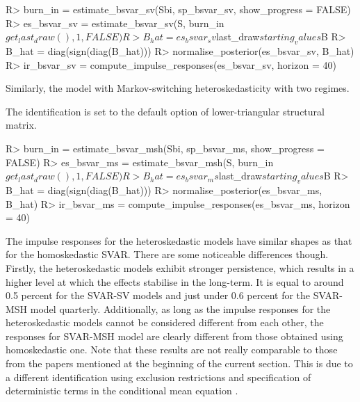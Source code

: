 \documentclass[
  nojss]{jss}
\begin{document}
\begin{CodeChunk}
\begin{CodeInput}
R> burn_in       = estimate_bsvar_sv(Sbi, sp_bsvar_sv, show_progress = FALSE)
R> es_bsvar_sv   = estimate_bsvar_sv(S, burn_in$get_last_draw(), 1, FALSE)
R> B_hat         = es_bsvar_sv$last_draw$starting_values$B
R> B_hat         = diag(sign(diag(B_hat))) %
R> normalise_posterior(es_bsvar_sv, B_hat)
R> ir_bsvar_sv   = compute_impulse_responses(es_bsvar_sv, horizon = 40)
\end{CodeInput}
\end{CodeChunk}

Similarly, the model with Markov-switching heteroskedasticity with two
regimes.

\begin{CodeChunk}
\begin{CodeOutput}
The identification is set to the default option of lower-triangular structural matrix.
\end{CodeOutput}
\end{CodeChunk}

\begin{CodeChunk}
\begin{CodeInput}
R> burn_in       = estimate_bsvar_msh(Sbi, sp_bsvar_ms, show_progress = FALSE)
R> es_bsvar_ms   = estimate_bsvar_msh(S, burn_in$get_last_draw(), 1, FALSE)
R> B_hat         = es_bsvar_ms$last_draw$starting_values$B
R> B_hat         = diag(sign(diag(B_hat))) %
R> normalise_posterior(es_bsvar_ms, B_hat)
R> ir_bsvar_ms   = compute_impulse_responses(es_bsvar_ms, horizon = 40)
\end{CodeInput}
\end{CodeChunk}

The impulse responses for the heteroskedastic models have similar shapes
as that for the homoskedastic SVAR. There are some noticeable
differences though. Firstly, the heteroskedastic models exhibit stronger
persistence, which results in a higher level at which the effects
stabilise in the long-term. It is equal to around 0.5 percent for the
SVAR-SV models and just under 0.6 percent for the SVAR-MSH model
quarterly. Additionally, as long as the impulse responses for the
heteroskedastic models cannot be considered different from each other,
the responses for SVAR-MSH model are clearly different from those
obtained using homoskedastic one. Note that these results are not really
comparable to those from the papers mentioned at the beginning of the
current section. This is due to a different identification using
exclusion restrictions and specification of deterministic terms in the
conditional mean equation \citep[see][for more details]{LSUW2022}.
\end{document}
